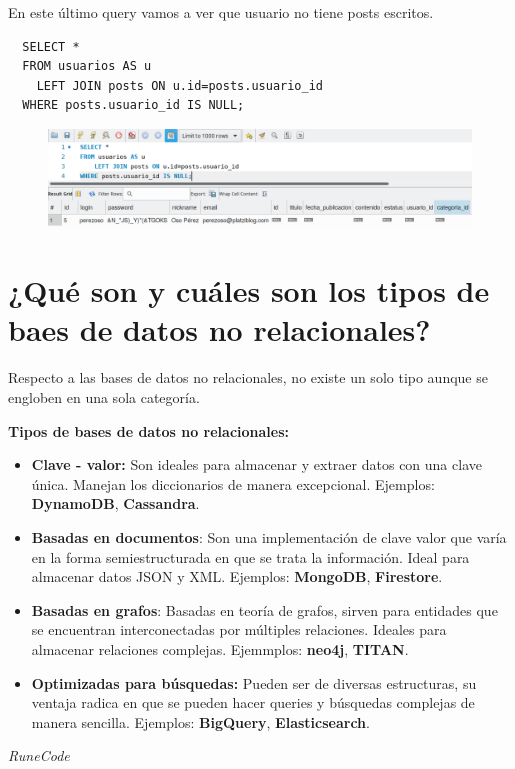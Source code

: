 \documentclass{article}
\begin{document}
En este último query vamos a ver que usuario no tiene posts escritos.\\

\begin{verbatim}
  SELECT *
  FROM usuarios AS u
    LEFT JOIN posts ON u.id=posts.usuario_id
  WHERE posts.usuario_id IS NULL;
\end{verbatim}

\begin{figure}[h!]
  \centering
  \includegraphics[scale=0.75]{./Pictures/142_eighth_question.png}
\end{figure}


\section{¿Qué son y cuáles son los tipos de baes de datos no relacionales?}%
Respecto a las bases de datos no relacionales, no existe un solo tipo aunque se
engloben en una sola categoría.

\textbf{Tipos de bases de datos no relacionales:}\\

\begin{itemize}
  \item \textbf{Clave - valor:} Son ideales para almacenar y extraer datos con
    una clave única. Manejan los diccionarios de manera excepcional. Ejemplos:
    \textbf{DynamoDB}, \textbf{Cassandra}.
  \item \textbf{Basadas en documentos}: Son una implementación de clave valor
    que varía en la forma semiestructurada en que se trata la información.
    Ideal para almacenar datos JSON y XML. Ejemplos: \textbf{MongoDB},
    \textbf{Firestore}.
  \item \textbf{Basadas en grafos}: Basadas en teoría de grafos, sirven para
    entidades que se encuentran interconectadas por múltiples relaciones.
    Ideales para almacenar relaciones complejas. Ejemmplos: \textbf{neo4j},
    \textbf{TITAN}.
  \item \textbf{Optimizadas para búsquedas:} Pueden ser de diversas
    estructuras, su ventaja radica en que se pueden hacer queries y búsquedas
    complejas de manera sencilla. Ejemplos: \textbf{BigQuery},
    \textbf{Elasticsearch}.
\end{itemize}




























\vspace{2cm}
\LARGE\textit{RuneCode}
\end{document}
